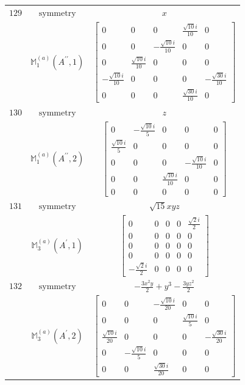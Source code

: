 \documentclass[fleqn,8pt,landscape]{jsarticle}
\begin{document}
\begin{longtable}{ccc}
$ 129 $ & $ \text{symmetry} $ & $ x $ \\
$  $ & $ \mathbb{M}_{1}^{(a)}(A^{\prime\prime},1) $ & $ \begin{bmatrix} 0 & 0 & 0 & \frac{\sqrt{10} i}{10} & 0 \\ 0 & 0 & - \frac{\sqrt{10} i}{10} & 0 & 0 \\ 0 & \frac{\sqrt{10} i}{10} & 0 & 0 & 0 \\ - \frac{\sqrt{10} i}{10} & 0 & 0 & 0 & - \frac{\sqrt{30} i}{10} \\ 0 & 0 & 0 & \frac{\sqrt{30} i}{10} & 0 \end{bmatrix} $ \\ \hline
$ 130 $ & $ \text{symmetry} $ & $ z $ \\
$  $ & $ \mathbb{M}_{1}^{(a)}(A^{\prime\prime},2) $ & $ \begin{bmatrix} 0 & - \frac{\sqrt{10} i}{5} & 0 & 0 & 0 \\ \frac{\sqrt{10} i}{5} & 0 & 0 & 0 & 0 \\ 0 & 0 & 0 & - \frac{\sqrt{10} i}{10} & 0 \\ 0 & 0 & \frac{\sqrt{10} i}{10} & 0 & 0 \\ 0 & 0 & 0 & 0 & 0 \end{bmatrix} $ \\ \hline
$ 131 $ & $ \text{symmetry} $ & $ \sqrt{15} x y z $ \\
$  $ & $ \mathbb{M}_{3}^{(a)}(A^{\prime},1) $ & $ \begin{bmatrix} 0 & 0 & 0 & 0 & \frac{\sqrt{2} i}{2} \\ 0 & 0 & 0 & 0 & 0 \\ 0 & 0 & 0 & 0 & 0 \\ 0 & 0 & 0 & 0 & 0 \\ - \frac{\sqrt{2} i}{2} & 0 & 0 & 0 & 0 \end{bmatrix} $ \\ \hline
$ 132 $ & $ \text{symmetry} $ & $ - \frac{3 x^{2} y}{2} + y^{3} - \frac{3 y z^{2}}{2} $ \\
$  $ & $ \mathbb{M}_{3}^{(a)}(A^{\prime},2) $ & $ \begin{bmatrix} 0 & 0 & - \frac{\sqrt{10} i}{20} & 0 & 0 \\ 0 & 0 & 0 & \frac{\sqrt{10} i}{5} & 0 \\ \frac{\sqrt{10} i}{20} & 0 & 0 & 0 & - \frac{\sqrt{30} i}{20} \\ 0 & - \frac{\sqrt{10} i}{5} & 0 & 0 & 0 \\ 0 & 0 & \frac{\sqrt{30} i}{20} & 0 & 0 \end{bmatrix} $ \\ \hline

\end{longtable}
\end{document}
